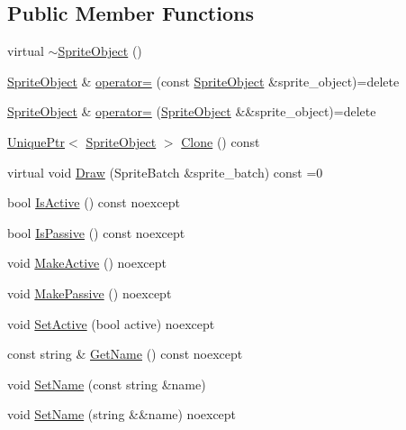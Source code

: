\subsection*{Public Member Functions}
\begin{DoxyCompactItemize}
\item 
virtual \hyperlink{classmage_1_1_sprite_object_aad4d1472cb468d8c19b61ab030332ceb}{$\sim$\+Sprite\+Object} ()
\item 
\hyperlink{classmage_1_1_sprite_object}{Sprite\+Object} \& \hyperlink{classmage_1_1_sprite_object_ab24af642e7c49a13ca5526248f106b4e}{operator=} (const \hyperlink{classmage_1_1_sprite_object}{Sprite\+Object} \&sprite\+\_\+object)=delete
\item 
\hyperlink{classmage_1_1_sprite_object}{Sprite\+Object} \& \hyperlink{classmage_1_1_sprite_object_a0d098954e6ef5b331b2b7e6f6cb3c21e}{operator=} (\hyperlink{classmage_1_1_sprite_object}{Sprite\+Object} \&\&sprite\+\_\+object)=delete
\item 
\hyperlink{namespacemage_a8c307fbcc33bce9b7f2aa4c26c3b95cf}{Unique\+Ptr}$<$ \hyperlink{classmage_1_1_sprite_object}{Sprite\+Object} $>$ \hyperlink{classmage_1_1_sprite_object_a761528ee815cbac83f9a490e07752e5c}{Clone} () const
\item 
virtual void \hyperlink{classmage_1_1_sprite_object_a1c1c885fe7846f7ee1cc0b73571c2fa0}{Draw} (Sprite\+Batch \&sprite\+\_\+batch) const =0
\item 
bool \hyperlink{classmage_1_1_sprite_object_a4fbb934427eee923548dd027e19dc9ba}{Is\+Active} () const noexcept
\item 
bool \hyperlink{classmage_1_1_sprite_object_a194682f23dbdf7ce5a7345eaba4c2fa1}{Is\+Passive} () const noexcept
\item 
void \hyperlink{classmage_1_1_sprite_object_a145bdced3ec8ef41dfaf615f4ad7b1ef}{Make\+Active} () noexcept
\item 
void \hyperlink{classmage_1_1_sprite_object_a0d778b381ab405ae5fc6a858d6d465e0}{Make\+Passive} () noexcept
\item 
void \hyperlink{classmage_1_1_sprite_object_a8f27da427493db1567b842b83fa10f65}{Set\+Active} (bool active) noexcept
\item 
const string \& \hyperlink{classmage_1_1_sprite_object_a1bfe66d73a37eac4c8e8a7b0e17112aa}{Get\+Name} () const noexcept
\item 
void \hyperlink{classmage_1_1_sprite_object_a784cd7d61f3a9f71a521656ae3199366}{Set\+Name} (const string \&name)
\item 
void \hyperlink{classmage_1_1_sprite_object_a62d570d43c7b83042f0709fef6e273f4}{Set\+Name} (string \&\&name) noexcept

\end{DoxyCompactItemize}
